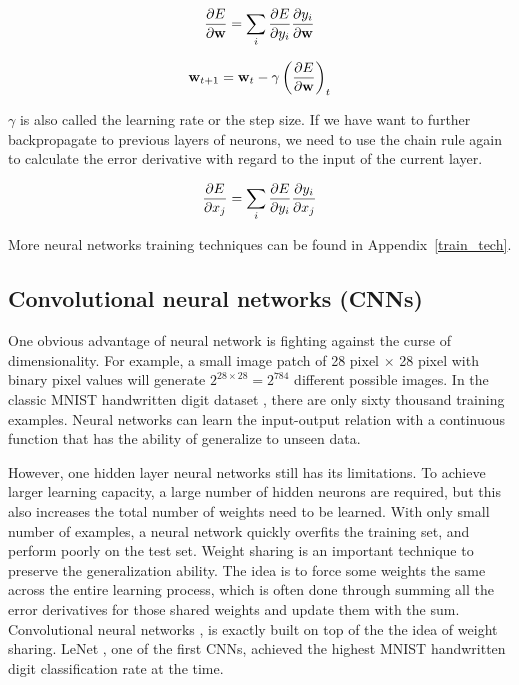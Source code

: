\begin{equation}
\dfrac{\partial E}{\partial \mathbf{w}} = \sum_i \dfrac{\partial E}{\partial y_i} \dfrac{\partial y_i}{\partial \mathbf{w}}
\end{equation}

\begin{equation}
\mathbf{w}_{t+1} = \mathbf{w}_{t} - \gamma \left(\dfrac{\partial E}{\partial \mathbf{w}}\right)_t
\end{equation}

$\gamma$ is also called the learning rate or the step size. If we have want to further backpropagate to previous layers of neurons, we need to use the chain rule again to calculate the error derivative with regard to the input of the current layer.

\begin{equation}
\dfrac{\partial E}{\partial x_j} = \sum_i \dfrac{\partial E}{\partial y_i} \dfrac{\partial y_i}{\partial x_j}
\end{equation}

More neural networks training techniques can be found in Appendix~\ref{train_tech}.

\subsection{Convolutional neural networks (CNNs)}
One obvious advantage of neural network is fighting against the curse of dimensionality. For example, a small image patch of 28 pixel $\times$ 28 pixel with binary pixel values will generate $2^{28 \times 28} = 2^{784}$ different possible images. In the classic MNIST handwritten digit dataset \cite{lecun98}, there are only sixty thousand training examples. Neural networks can learn the input-output relation with a continuous function that has the ability of generalize to unseen data. 

However, one hidden layer neural networks still has its limitations. To achieve larger learning capacity, a large number of hidden neurons are required, but this also increases the total number of weights need to be learned. With only small number of examples, a neural network quickly overfits the training set, and perform poorly on the test set. Weight sharing is an important technique to preserve the generalization ability. The idea is to force some weights the same across the entire learning process, which is often done through summing all the error derivatives for those shared weights and update them with the sum. Convolutional neural networks \cite{lecun98}, is exactly built on top of the the idea of weight sharing. LeNet \cite{lecun98}, one of the first CNNs, achieved the highest MNIST handwritten digit classification rate at the time. 

